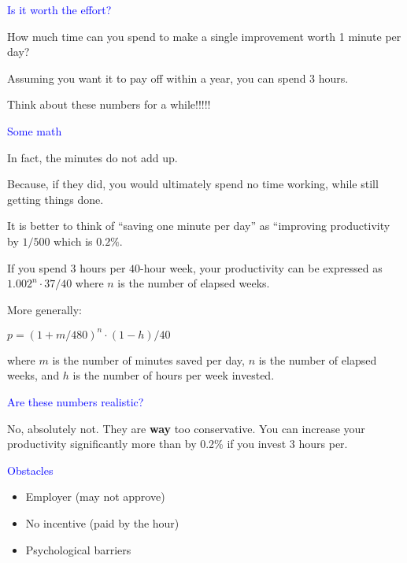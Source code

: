 \documentclass{slides}
\newcommand{\ti}[1]{\begin{center}\Large{\textcolor{blue}{#1}}\end{center}}
\begin{document}
\begin{slide}\ti{Is it worth the effort?}

How much time can you spend to make a single improvement worth 1
minute per day?

Assuming you want it to pay off within a year, you can spend 3 hours.

Think about these numbers for a while!!!!!

\vfill\end{slide}
\begin{slide}\ti{Some math}

In fact, the minutes do not add up.

Because, if they did, you would ultimately spend no time working,
while still getting things done.

It is better to think of ``saving one minute per day'' as ``improving
productivity by $1/500$ which is $0.2\%$.

If you spend $3$ hours per $40$-hour week, your productivity can be
expressed as $1.002^n\cdot 37/40$ where $n$ is the number of elapsed
weeks.

More generally:

$p= (1+m/480)^n \cdot (1-h)/40$

where $m$ is the number of minutes saved per day, $n$ is the number of
elapsed weeks, and $h$ is the number of hours per week invested.

\vfill\end{slide}
\begin{slide}\ti{Are these numbers realistic?}

No, absolutely not.  They are \textbf{way} too conservative.  You can
increase your productivity significantly more than by 0.2\% if you
invest $3$ hours per.

\vfill\end{slide}
\begin{slide}\ti{Obstacles}

  \begin{itemize}
  \item Employer (may not approve)
  \item No incentive (paid by the hour)
  \item Psychological barriers
  \end{itemize}

\vfill\end{slide}
\end{document}
